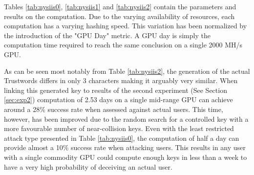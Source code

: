 Tables \ref{tab:nysiis0}, \ref{tab:nysiis1} and \ref{tab:nysiis2} contain the parameters and results on the computation. Due to the varying availability of resources, each computation has a varying hashing speed. This variation has been normalized by the introduction of the "GPU Day" metric. A GPU day is simply the computation time required to reach the same conclusion on a single 2000 MH/s GPU. 

As can be seen most notably from Table \ref{tab:nysiis2}, the generation of the actual Trustwords differs in only 3 characters making it arguably very similar. When linking this generated key to results of the second experiment (See Section \ref{sec:exp2}) computation of 2.53 days on a single mid-range GPU can achieve around a 28\% success rate when assessed against actual users. This time, however, has been improved due to the random search for a controlled key with a more favourable number of near-collision keys. Even with the least restricted attack type presented in Table \ref{tab:nysiis0}, the computation of half a day can provide almost a 10\% success rate when attacking users. This results in any user with a single commodity GPU could compute enough keys in less than a week to have a very high probability of deceiving an actual user.
